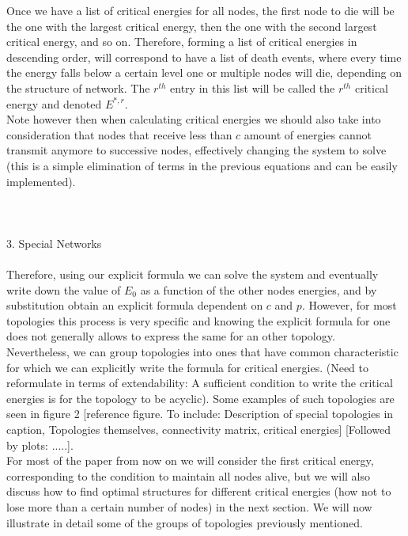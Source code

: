 \documentclass{amsart}
\theoremstyle{plain}
\numberwithin{equation}{section}
\begin{document}
	Once we have a list of critical energies for all nodes, the first node to die will be the one with the largest critical energy, then the one with the second largest critical energy, and so on. Therefore, forming a list of critical energies in descending order, will correspond to have a list of death events, where every time the energy falls below a certain level one or multiple nodes will die, depending on the structure of network. The $r^{th}$ entry in this list will be called the $r^{th}$ critical energy and denoted $E^{*,r}$.\\
Note however then when calculating critical energies we should also take into consideration that nodes that receive less than $c$ amount of energies cannot transmit anymore to successive nodes, effectively changing the system to solve (this is a simple elimination of terms in the previous equations and can be easily implemented).
	\\
	\\
	\\
	\\
3. Special Networks\\
\\
Therefore, using our explicit formula we can solve the system and eventually write down the value of $E_0$ as a function of the other nodes energies, and by substitution obtain an explicit formula dependent on $c$ and $p$. However, for most topologies this process is very specific and knowing the explicit formula for one does not generally allows to express the same for an other topology.\\
Nevertheless, we can group topologies into ones that have common characteristic for which we can explicitly write the formula for critical energies. (Need to reformulate in terms of extendability: A sufficient condition to write the critical energies is for the topology to be acyclic). Some examples of such topologies are seen in figure 2 [reference figure. To include: Description of special topologies in caption, Topologies themselves, connectivity matrix, critical energies] 
[Followed by plots: .....].\\
For most of the paper from now on we will consider the first critical energy, corresponding to the condition to maintain all nodes alive, but we will also discuss how to find optimal structures for different critical energies (how not to lose more than a certain number of nodes) in the next section.
We will now illustrate in detail some of the groups of topologies previously mentioned.\\
\end{document}
